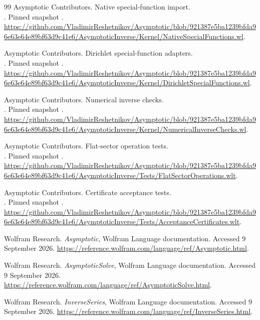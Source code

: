 \begin{thebibliography}{99}
 Asymptotic Contributors. Native special-function import.\\
. Pinned snapshot . \url{https://github.com/VladimirReshetnikov/Asymptotic/blob/921387e5ba1239bfda96e63e64e89bf63d9c41e6/AsymptoticInverse/Kernel/NativeSpecialFunctions.wl}.

 Asymptotic Contributors. Dirichlet special-function adapters.\\
. Pinned snapshot . \url{https://github.com/VladimirReshetnikov/Asymptotic/blob/921387e5ba1239bfda96e63e64e89bf63d9c41e6/AsymptoticInverse/Kernel/DirichletSpecialFunctions.wl}.

 Asymptotic Contributors. Numerical inverse checks.\\
. Pinned snapshot . \url{https://github.com/VladimirReshetnikov/Asymptotic/blob/921387e5ba1239bfda96e63e64e89bf63d9c41e6/AsymptoticInverse/Kernel/NumericalInverseChecks.wl}.

 Asymptotic Contributors. Flat-sector operation tests.\\
. Pinned snapshot . \url{https://github.com/VladimirReshetnikov/Asymptotic/blob/921387e5ba1239bfda96e63e64e89bf63d9c41e6/AsymptoticInverse/Tests/FlatSectorOperations.wlt}.

 Asymptotic Contributors. Certificate acceptance tests.\\
. Pinned snapshot . \url{https://github.com/VladimirReshetnikov/Asymptotic/blob/921387e5ba1239bfda96e63e64e89bf63d9c41e6/AsymptoticInverse/Tests/AcceptanceCertificates.wlt}.

 Wolfram Research. \emph{Asymptotic}, Wolfram Language documentation. Accessed 9 September 2026. \url{https://reference.wolfram.com/language/ref/Asymptotic.html}.

 Wolfram Research. \emph{AsymptoticSolve}, Wolfram Language documentation. Accessed 9 September 2026. \url{https://reference.wolfram.com/language/ref/AsymptoticSolve.html}.

 Wolfram Research. \emph{InverseSeries}, Wolfram Language documentation. Accessed 9 September 2026. \url{https://reference.wolfram.com/language/ref/InverseSeries.html}.


\end{thebibliography}
